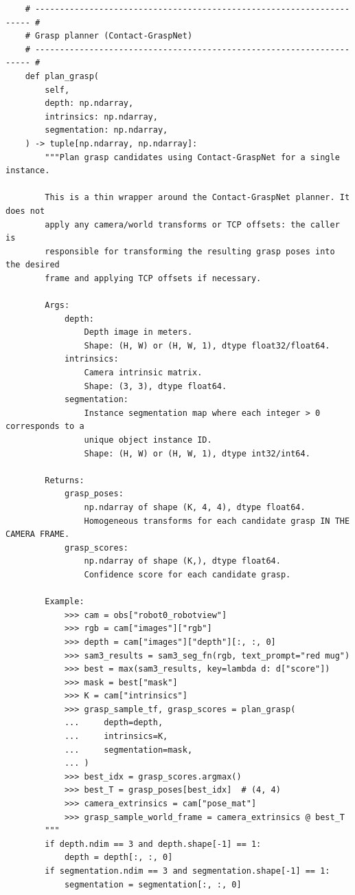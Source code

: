 \begin{lstlisting}
    # --------------------------------------------------------------------- #
    # Grasp planner (Contact-GraspNet)
    # --------------------------------------------------------------------- #
    def plan_grasp(
        self,
        depth: np.ndarray,
        intrinsics: np.ndarray,
        segmentation: np.ndarray,
    ) -> tuple[np.ndarray, np.ndarray]:
        """Plan grasp candidates using Contact-GraspNet for a single instance.

        This is a thin wrapper around the Contact-GraspNet planner. It does not
        apply any camera/world transforms or TCP offsets: the caller is
        responsible for transforming the resulting grasp poses into the desired
        frame and applying TCP offsets if necessary.

        Args:
            depth:
                Depth image in meters.
                Shape: (H, W) or (H, W, 1), dtype float32/float64.
            intrinsics:
                Camera intrinsic matrix.
                Shape: (3, 3), dtype float64.
            segmentation:
                Instance segmentation map where each integer > 0 corresponds to a
                unique object instance ID.
                Shape: (H, W) or (H, W, 1), dtype int32/int64.

        Returns:
            grasp_poses:
                np.ndarray of shape (K, 4, 4), dtype float64.
                Homogeneous transforms for each candidate grasp IN THE CAMERA FRAME.
            grasp_scores:
                np.ndarray of shape (K,), dtype float64.
                Confidence score for each candidate grasp.

        Example:
            >>> cam = obs["robot0_robotview"]
            >>> rgb = cam["images"]["rgb"]
            >>> depth = cam["images"]["depth"][:, :, 0]
            >>> sam3_results = sam3_seg_fn(rgb, text_prompt="red mug")
            >>> best = max(sam3_results, key=lambda d: d["score"])
            >>> mask = best["mask"]
            >>> K = cam["intrinsics"]
            >>> grasp_sample_tf, grasp_scores = plan_grasp(
            ...     depth=depth,
            ...     intrinsics=K,
            ...     segmentation=mask,
            ... )
            >>> best_idx = grasp_scores.argmax()
            >>> best_T = grasp_poses[best_idx]  # (4, 4)
            >>> camera_extrinsics = cam["pose_mat"]
            >>> grasp_sample_world_frame = camera_extrinsics @ best_T
        """
        if depth.ndim == 3 and depth.shape[-1] == 1:
            depth = depth[:, :, 0]
        if segmentation.ndim == 3 and segmentation.shape[-1] == 1:
            segmentation = segmentation[:, :, 0]


\end{lstlisting}
